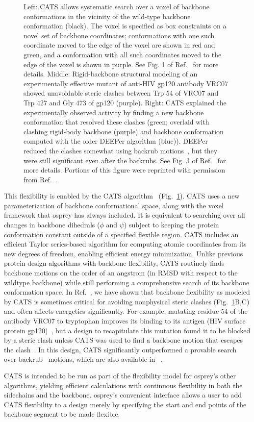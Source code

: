 \begin{figure}
\caption{Left: CATS allows systematic search over a voxel of backbone conformations in the vicinity of the wild-type backbone conformation (black).  The voxel is specified as box constraints on a novel set of backbone coordinates; conformations with one such coordinate moved to the edge of the voxel are shown in red and green, and a conformation with all such coordinates moved to the edge of the voxel is shown in purple.  See Fig. 1 of Ref.~ for more details.  Middle: Rigid-backbone structural modeling of an experimentally effective mutant of anti-HIV gp120 antibody VRC07 showed unavoidable steric clashes between Trp 54 of VRC07 and Trp 427 and Gly 473 of gp120 (purple).  Right: CATS explained the experimentally observed activity by finding a new backbone conformation that resolved these clashes (green; overlaid with clashing rigid-body backbone (purple) and backbone conformation computed with the older DEEPer algorithm (blue)).  DEEPer reduced the clashes somewhat using backrub motions~\cite{backrub}, but they were still significant even after the backrubs.  See Fig. 3 of Ref.~ for more details.   Portions of this figure were reprinted with permission from Ref.~.  }
\label{fig:cats}
\end{figure}

This flexibility is enabled by the CATS algorithm~\cite{CATS} (Fig.~\ref{fig:cats}).  CATS uses a new parameterization of backbone conformational space, along with the voxel framework that {\sc osprey} has always included.  It is equivalent to searching over all changes in backbone dihedrals ($\phi$ and $\psi$) subject to keeping the protein conformation constant outside of a specified flexible region. CATS includes an efficient Taylor series-based algorithm for computing atomic coordinates from its new degrees of freedom, enabling efficient energy minimization.  Unlike previous protein design algorithms with backbone flexibility, CATS routinely finds backbone motions on the order of an angstrom (in RMSD with respect to the wildtype backbone) while still performing a comprehensive search of its backbone conformation space.  In Ref.~, we have shown that backbone flexibility as modeled by CATS is sometimes critical for avoiding nonphysical steric clashes (Fig.~\ref{fig:cats}B,C) and often affects energetics significantly.  For example, mutating residue 54 of the antibody VRC07 to tryptophan improves its binding to its antigen (HIV surface protein gp120)~\cite{VRC07_enhance}, but a design to recapitulate this mutation found it to be blocked by a steric clash unless CATS was used to find a backbone motion that escapes the clash~\cite{CATS}.  In this design, CATS significantly outperformed a provable search over backrub~\cite{backrub} motions, which are also available in \osprey~\cite{BRDEE,DEEPer}.  

CATS is intended to be run as part of the flexibility model for {\sc osprey}'s other algorithms, yielding efficient calculations with continuous flexibility in both the sidechains and the backbone. {\sc osprey}'s convenient interface allows a user to add CATS flexibility to a design merely by specifying the start and end points of the backbone segment to be made flexible.  

